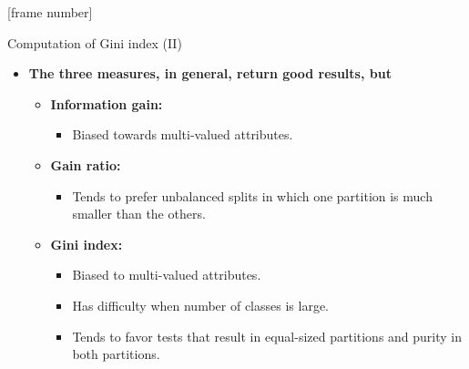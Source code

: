 \documentclass[aspectratio=169,t,table]{beamer}
\begin{document}
  {
    [frame number]
    \begin{frame}{Computation of Gini index (II)}
      \begin{itemize}
        \item \textbf{The three measures, in general, return good results, but}
        \begin{itemize}
          \item \textbf{\color{airforceblue}Information gain:}
          \begin{itemize}
            \item Biased towards multi-valued attributes.
          \end{itemize}
          \item \textbf{\color{airforceblue}Gain ratio:}
          \begin{itemize}
            \item Tends to prefer unbalanced splits in which one partition is much smaller than the others.
          \end{itemize}
          \item \textbf{\color{airforceblue}Gini index:}
          \begin{itemize}
            \item Biased to multi-valued attributes.
            \item Has difficulty when number of classes is large.
            \item Tends to favor tests that result in equal-sized partitions and purity in both partitions.
          \end{itemize}
        \end{itemize}
      \end{itemize}
    \end{frame}
  }
\end{document}
